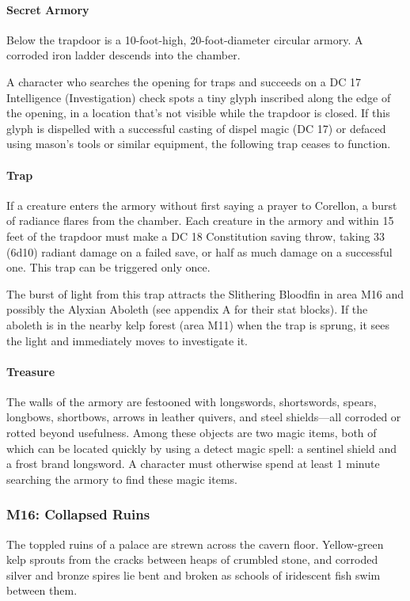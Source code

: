 \documentclass[10pt,a4paper,twoside,twocolumn,openany,nodeprecatedcode]{dndbook}
\begin{document}
\paragraph{Secret Armory}
Below the trapdoor is a 10-foot-high, 20-foot-diameter circular armory. A corroded iron ladder descends into the chamber.

A character who searches the opening for traps and succeeds on a DC 17 Intelligence (Investigation) check spots a tiny glyph inscribed along the edge of the opening, in a location that's not visible while the trapdoor is closed. If this glyph is dispelled with a successful casting of dispel magic (DC 17) or defaced using mason's tools or similar equipment, the following trap ceases to function.

\paragraph{Trap}
If a creature enters the armory without first saying a prayer to Corellon, a burst of radiance flares from the chamber. Each creature in the armory and within 15 feet of the trapdoor must make a DC 18 Constitution saving throw, taking 33 (6d10) radiant damage on a failed save, or half as much damage on a successful one. This trap can be triggered only once.

The burst of light from this trap attracts the Slithering Bloodfin in area M16 and possibly the Alyxian Aboleth (see appendix A for their stat blocks). If the aboleth is in the nearby kelp forest (area M11) when the trap is sprung, it sees the light and immediately moves to investigate it.

\paragraph{Treasure}
The walls of the armory are festooned with longswords, shortswords, spears, longbows, shortbows, arrows in leather quivers, and steel shields—all corroded or rotted beyond usefulness. Among these objects are two magic items, both of which can be located quickly by using a detect magic spell: a sentinel shield and a frost brand longsword. A character must otherwise spend at least 1 minute searching the armory to find these magic items.

\subsubsection{M16: Collapsed Ruins}
\begin{DndReadAloud}{}
The toppled ruins of a palace are strewn across the cavern floor. Yellow-green kelp sprouts from the cracks between heaps of crumbled stone, and corroded silver and bronze spires lie bent and broken as schools of iridescent fish swim between them.

\end{DndReadAloud}
\end{document}
